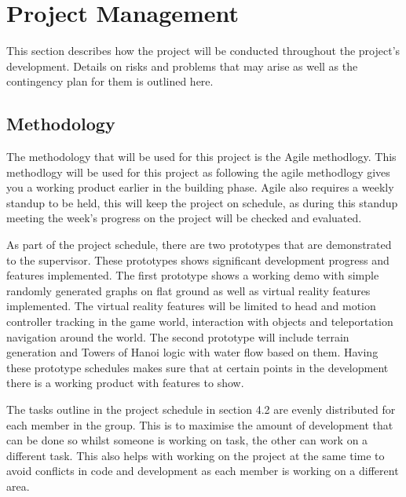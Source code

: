 \chapter{Project Management}
\label{chapter4}

This section describes how the project will be conducted throughout the project's development. Details on risks and problems that may arise as well as the contingency plan for them is outlined here.

\section{Methodology}
The methodology that will be used for this project is the Agile methodlogy. This methodlogy will be used for this project as following the agile methodlogy gives you a working product earlier in the building phase. Agile also requires a weekly standup to be held, this will keep the project on schedule, as during this standup meeting the week's progress on the project will be checked and evaluated.  
\newline
\par
As part of the project schedule, there are two prototypes that are demonstrated to the supervisor. These prototypes shows significant development progress and features implemented. The first prototype shows a working demo with simple randomly generated graphs on flat ground as well as virtual reality features implemented. The virtual reality features will be limited to head and motion controller tracking in the game world, interaction with objects and teleportation navigation around the world. The second prototype will include terrain generation and Towers of Hanoi logic with water flow based on them. Having these prototype schedules makes sure that at certain points in the development there is a working product with features to show.
\newline
\par
The tasks outline in the project schedule in section 4.2 are evenly distributed for each member in the group. This is to maximise the amount of development that can be done so whilst someone is working on task, the other can work on a different task. This also helps with working on the project at the same time to avoid conflicts in code and development as each member is working on a different area.
\clearpage
